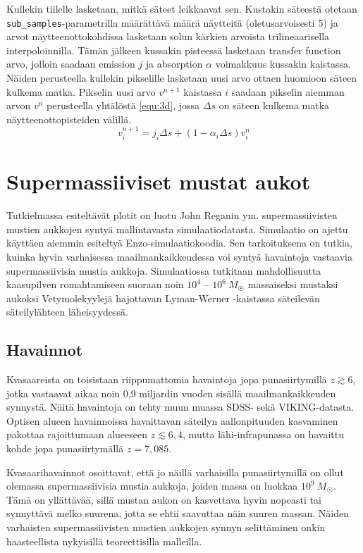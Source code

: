 \documentclass[12pt,a4paper]{article}
\begin{document}
\begin{sloppypar}
Kullekin tiilelle lasketaan, mitkä säteet leikkaavat sen. Kustakin säteestä otetaan \texttt{sub\_samples}-parametrilla määrättävä määrä näytteitä (oletusarvoisesti 5) ja arvot näytteenottokohdissa lasketaan solun kärkien arvoista trilineaarisella interpoloinnilla. Tämän jälkeen kussakin pisteessä lasketaan transfer function arvo, jolloin saadaan emission $j$ ja absorption $\alpha$ voimakkuus kussakin kaistassa. Näiden perusteella kullekin pikselille lasketaan uusi arvo ottaen huomioon säteen kulkema matka. Pikselin uusi arvo $v^{n+1}$ kaistassa $i$ saadaan pikselin aiemman arvon $v^n$ perusteella yhtälöstä \ref{equ:3d}, jossa $\Delta s$ on säteen kulkema matka näytteenottopisteiden välillä.
\begin{equation}\label{equ:3d}
v^{n+1}_{i} =  j_{i}\Delta s + (1 - \alpha_{i}\Delta s )v^{n}_{i}
\end{equation}
\end{sloppypar}


\section{Supermassiiviset mustat aukot}
Tutkielmassa esiteltävät plotit on luotu John Reganin ym. supermassiivisten mustien aukkojen syntyä mallintavasta simulaatiodatasta. Simulaatio on ajettu käyttäen aiemmin esiteltyä Enzo-simulaatiokoodia. Sen tarkoituksena on tutkia, kuinka hyvin varhaisessa maailmankaikkeudessa voi syntyä havaintoja vastaavia supermassiivisia mustia aukkoja. Simulaatiossa tutkitaan mahdollisuutta kaasupilven romahtamiseen suoraan noin $10^4$ -- $10^6~ M_{\astrosun}$ massaiseksi mustaksi aukoksi Vetymolekyylejä hajottavan Lyman-Werner -kaistassa säteilevän säteilylähteen läheisyydessä. \cite{rj}

\subsection{Havainnot}
Kvasaareista on toisistaan riippumattomia havaintoja jopa punasiirtymillä $z \gtrsim 6$, jotka vastaavat aikaa noin 0,9 miljardin vuoden sisällä maailmankaikkeuden synnystä. Näitä havaintoja on tehty muun muassa SDSS- sekä VIKING-datasta. Optisen alueen havainnoissa havaittavan säteilyn aallonpituuden kasvaminen pakottaa rajoittumaan alueeseen $z \lesssim 6,4$, mutta lähi-infrapunassa on havaittu kohde jopa punasiirtymällä $z= 7,085$. \cite{fan, mortlock, venemans}

Kvasaarihavainnot osoittavat, että jo näillä varhaisilla punasiirtymillä on ollut olemassa supermassiivisia mustia aukkoja, joiden massa on luokkaa $10^9 ~M_{\astrosun}$. Tämä on yllättävää, sillä mustan aukon on kasvettava hyvin nopeasti tai synnyttävä melko suurena, jotta se ehtii saavuttaa näin suuren massan. Näiden varhaisten supermassiivisten mustien aukkojen synnyn selittäminen onkin haasteellista nykyisillä teoreettisilla malleilla. \cite{li}
\end{document}
